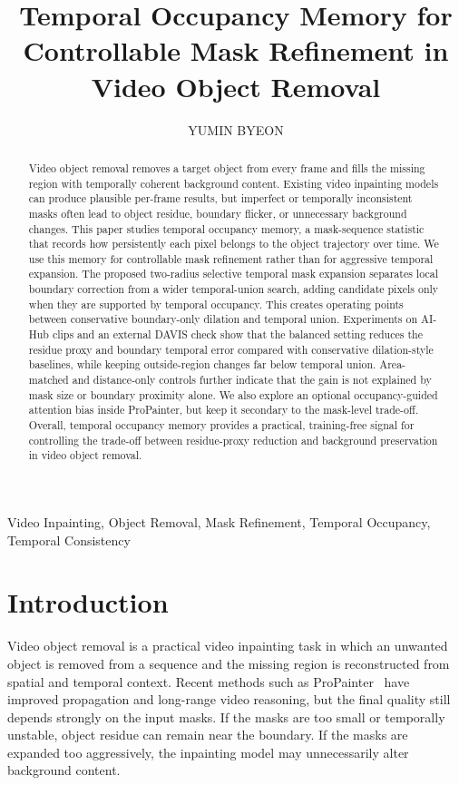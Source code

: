 \documentclass[nouppercase]{kaia}
\title{Temporal Occupancy Memory for Controllable Mask Refinement in Video Object Removal}
\author{YUMIN BYEON}{a}
\affiliation{School of Computer Science and Engineering, Yeungnam University, Gyeongsan, Republic of Korea, youmin5317@yu.ac.kr}{a}
\begin{document}
\maketitle
\begin{abstract}
Video object removal removes a target object from every frame and fills the missing region with temporally coherent background content. Existing video inpainting models can produce plausible per-frame results, but imperfect or temporally inconsistent masks often lead to object residue, boundary flicker, or unnecessary background changes. This paper studies temporal occupancy memory, a mask-sequence statistic that records how persistently each pixel belongs to the object trajectory over time. We use this memory for controllable mask refinement rather than for aggressive temporal expansion. The proposed two-radius selective temporal mask expansion separates local boundary correction from a wider temporal-union search, adding candidate pixels only when they are supported by temporal occupancy. This creates operating points between conservative boundary-only dilation and temporal union. Experiments on AI-Hub clips and an external DAVIS check show that the balanced setting reduces the residue proxy and boundary temporal error compared with conservative dilation-style baselines, while keeping outside-region changes far below temporal union. Area-matched and distance-only controls further indicate that the gain is not explained by mask size or boundary proximity alone. We also explore an optional occupancy-guided attention bias inside ProPainter, but keep it secondary to the mask-level trade-off. Overall, temporal occupancy memory provides a practical, training-free signal for controlling the trade-off between residue-proxy reduction and background preservation in video object removal.
\end{abstract}

\begin{keywords}
Video Inpainting, Object Removal, Mask Refinement, Temporal Occupancy, Temporal Consistency
\end{keywords}

\section{Introduction}
Video object removal is a practical video inpainting task in which an unwanted object is removed from a sequence and the missing region is reconstructed from spatial and temporal context. Recent methods such as ProPainter~\cite{zhou2023propainter} have improved propagation and long-range video reasoning, but the final quality still depends strongly on the input masks. If the masks are too small or temporally unstable, object residue can remain near the boundary. If the masks are expanded too aggressively, the inpainting model may unnecessarily alter background content.
\end{document}
